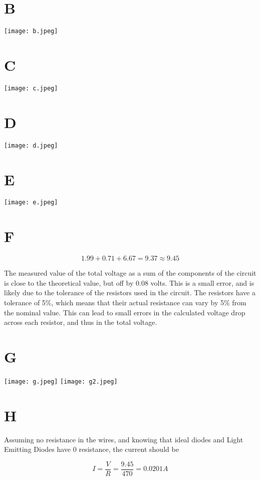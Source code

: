\documentclass[10pt]{article}
\begin{document}
\section*{B}

\begin{center}
	\texttt{[image: b.jpeg]}
\end{center}


\section*{C}

\begin{center}
	\texttt{[image: c.jpeg]}
\end{center}

\section*{D}
\begin{center}
	\texttt{[image: d.jpeg]}
\end{center}

\section*{E}
\begin{center}
	\texttt{[image: e.jpeg]}
\end{center}

\section*{F}
\[
	1.99 + 0.71 + 6.67 = 9.37 \approx 9.45
\]

The measured value of the total voltage as a sum of the components of the circuit is close to the theoretical value, but off by 0.08 volts. This is a small error, and is likely due to the tolerance of the resistors used in the circuit. The resistors have a tolerance of 5\%, which means that their actual resistance can vary by 5\% from the nominal value. This can lead to small errors in the calculated voltage drop across each resistor, and thus in the total voltage.

\section*{G}
\begin{center}
	\texttt{[image: g.jpeg]}
	\texttt{[image: g2.jpeg]}
\end{center}

\section*{H}

Assuming no resistance in the wires, and knowing that ideal diodes and Light Emitting Diodes have 0 resistance, the current should be

\[
    I = \frac{V}{R} = \frac{9.45}{470} = 0.0201 A
\]
\end{document}
